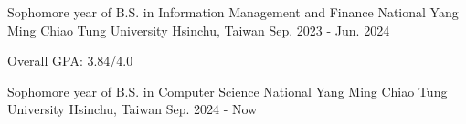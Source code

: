 

\begin{cventries}

\cventry
{Sophomore year of B.S. in Information Management and Finance} %
{National Yang Ming Chiao Tung University} %
{Hsinchu, Taiwan} %
{Sep. 2023 - Jun. 2024} %
{
  \begin{cvitems} %
    \item {Overall GPA: 3.84/4.0}
  \end{cvitems}
}

  \cventry
    {Sophomore year of B.S. in Computer Science} %
    {National Yang Ming Chiao Tung University} %
    {Hsinchu, Taiwan} %
    {Sep. 2024 - Now} %
    {
    }

\end{cventries}
